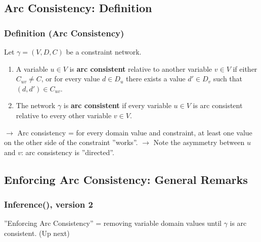 \documentclass[conference, a4paper]{styles/acmsiggraph}
\begin{document}
    
    \subsection{Arc Consistency: Definition}
        \subsubsection{Definition (Arc Consistency)}
            Let $\gamma = (V,D,C)$ be a constraint network.
            \begin{enumerate}
                \item A variable $u \in V$ is \textbf{arc consistent} relative to another variable $v \in V$ if either $C_{uv} \neq C$, or for every value $d \in D_u$ there exists a value $d' \in D_v$ such that $(d,d') \in C_{uv}$.
                \item The network $\gamma$ is \textbf{arc consistent} if every variable $u \in V$ is arc consistent relative to every other variable $v \in V$.
            \end{enumerate}
            
            $\rightarrow$ Arc consistency = for every domain value and constraint, at least one value on the other side of the constraint ''works''.\newline
            $\rightarrow$ Note the asymmetry between $u$ and $v$: arc consistency is ''directed''.
        
    \subsection{Enforcing Arc Consistency: General Remarks}
        \subsubsection{Inference(), version 2}
            ''Enforcing Arc Consistency'' = removing variable domain values until $\gamma$ is arc consistent. (Up next)
        
\end{document}
